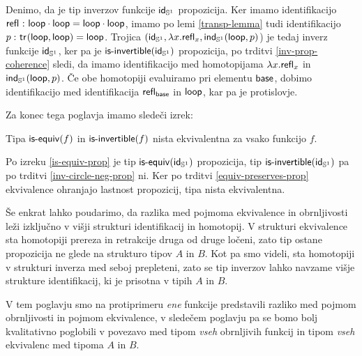 \begin{dokaz}
  Denimo, da je tip inverzov funkcije \(\textnormal{\textsf{id}}_{\mathbb{S}^{1}}\) propozicija. Ker imamo identifikacijo \(\textnormal{\textsf{refl}}_{} \,\colon \textnormal{\textsf{loop}} \cdot \textnormal{\textsf{loop}} = \textnormal{\textsf{loop}} \cdot \textnormal{\textsf{loop}}\), imamo po lemi \ref{transp-lemma} tudi identifikacijo \(p \,\colon \textnormal{\textsf{tr}}_{}(\textnormal{\textsf{loop}}, \textnormal{\textsf{loop}}) = \textnormal{\textsf{loop}}\). Trojica
  \((\textnormal{\textsf{id}}_{\mathbb{S}^{1}}, \lambda x. \textnormal{\textsf{refl}}_{x}, \textnormal{\textsf{ind}}_{\mathbb{S}^{1}}(\textnormal{\textsf{loop}}, p)\)) je tedaj inverz funkcije \(\textnormal{\textsf{id}}_{\mathbb{S}^{1}}\), ker pa je \(\textnormal{\textsf{is-invertible}}(\textnormal{\textsf{id}}_{\mathbb{S}^{1}})\) propozicija, po trditvi \ref{inv-prop-coherence} sledi, da imamo identifikacijo med homotopijama
  \(\lambda x.\textnormal{\textsf{refl}}_{x}\) in \(\textnormal{\textsf{ind}}_{\mathbb{S}^{1}}(\textnormal{\textsf{loop}}, p)\). Če obe homotopiji evaluiramo pri elementu \(\textnormal{\textsf{base}}\), dobimo identifikacijo med identifikacija \(\textnormal{\textsf{refl}}_{\textnormal{\textsf{base}}}\) in \(\textnormal{\textsf{loop}}\), kar pa je protislovje.
\end{dokaz}

Za konec tega poglavja imamo sledeči izrek:

\begin{izrek}
  Tipa \(\textnormal{\textsf{is-equiv}}(f)\) in \(\textnormal{\textsf{is-invertible}}(f)\) nista ekvivalentna za vsako funkcijo \(f\).
\end{izrek}

\begin{dokaz}
  Po izreku \ref{is-equiv-prop} je tip \(\textnormal{\textsf{is-equiv}}(\textnormal{\textsf{id}}_{\mathbb{S}^{1}})\) propozicija, tip \(\textnormal{\textsf{is-invertible}}(\textnormal{\textsf{id}}_{\mathbb{S}^{1}})\) pa po trditvi \ref{inv-circle-neg-prop} ni. Ker po trditvi \ref{equiv-preserves-prop} ekvivalence ohranjajo lastnost propozicij, tipa nista ekvivalentna.
\end{dokaz}

Še enkrat lahko poudarimo, da razlika med pojmoma ekvivalence in obrnljivosti leži izključno v višji strukturi identifikacij in homotopij. V strukturi ekvivalence sta homotopiji prereza in retrakcije druga od druge ločeni, zato tip ostane propozicija ne glede na strukturo tipov \(A\) in \(B\). Kot pa smo videli, sta homotopiji v strukturi inverza med seboj prepleteni, zato se tip inverzov lahko navzame višje strukture identifikacij, ki je prisotna v tipih \(A\) in \(B\).

V tem poglavju smo na protiprimeru \emph{ene} funkcije predstavili razliko med pojmom obrnljivosti in pojmom ekvivalence, v sledečem poglavju pa se bomo bolj kvalitativno poglobili v povezavo med tipom \emph{vseh} obrnljivih funkcij in tipom \emph{vseh} ekvivalenc med tipoma \(A\) in \(B\).

